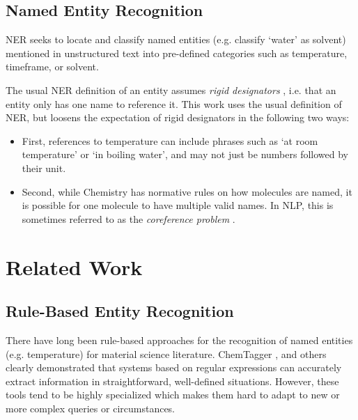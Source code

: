 \subsection{Named Entity Recognition}\label{sub:NER}
\gls{NER} seeks to locate and classify named entities (e.g. classify `water' as solvent) mentioned in unstructured text into pre-defined categories \cite{li_survey_2022} such as temperature, timeframe, or solvent.

The usual \gls{NER} definition of an entity assumes \textit{rigid designators} \cite{laporte_rigid_2022}, i.e. that an entity only has one name to reference it.
This work uses the usual definition of \gls{NER}, but loosens the expectation of rigid designators in the following two ways:

\begin{itemize}
    \item First, references to temperature can include phrases such as `at room temperature' or `in boiling water', and may not just be numbers followed by their unit.
    \item Second, while Chemistry has normative rules on how molecules are named, it is possible for one molecule to have multiple valid names.
In \gls{NLP}, this is sometimes referred to as the \textit{coreference problem} \cite{hobbs_coherence_1979}.
\end{itemize}



\section{Related Work}\label{sec:related}

\subsection{Rule-Based Entity Recognition}\label{sub:rule-based}
There have long been rule-based approaches for the recognition of named entities (e.g. temperature) for material science literature.
ChemTagger \cite{hawizy_chemicaltagger_2011}, and others \cite{beard_comparative_2019, huang_database_2020}
clearly demonstrated that systems based on regular expressions can accurately extract information in straightforward, well-defined situations.
However, these tools tend to be highly specialized which makes them hard to adapt to new or more complex queries or circumstances.


